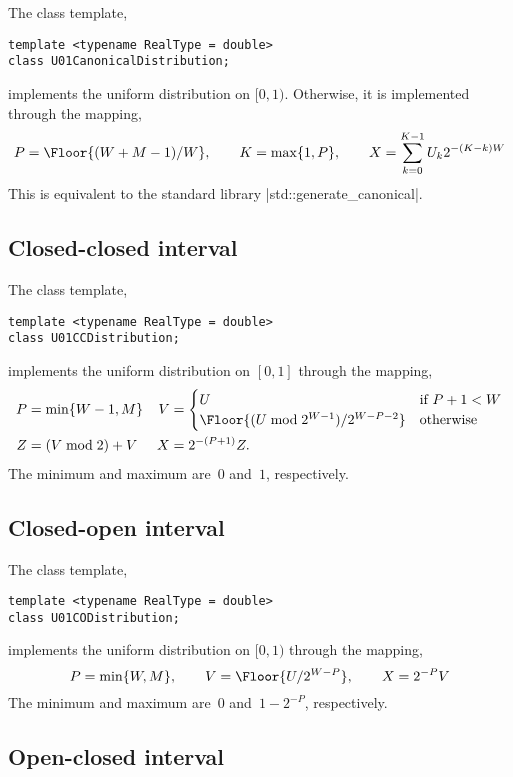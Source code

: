 The class template,
\begin{verbatim}
template <typename RealType = double>
class U01CanonicalDistribution;
\end{verbatim}
implements the uniform distribution on $[0, 1)$. Otherwise, it is implemented
through the mapping,
\begin{equation*}
  P = \Floor{(W + M - 1) / W},\qquad
  K = \max\{1, P\},\qquad
  X = \sum_{k=0}^{K - 1} U_k 2^{-(K - k)W}
\end{equation*}
This is equivalent to the standard library |std::generate_canonical|.

\subsection{Closed-closed interval}
\label{sub:Closed-closed interval}

The class template,
\begin{verbatim}
template <typename RealType = double>
class U01CCDistribution;
\end{verbatim}
implements the uniform distribution on $[0, 1]$ through the mapping,
\begin{align*}
  P &= \min\{W - 1, M\} &
  V &= \begin{cases}
    U &\text{if } P + 1 < W \\
    \Floor{(U \bmod 2^{W - 1}) / 2^{W - P -2}} &\text{otherwise}
  \end{cases} \\
  Z &= (V \bmod 2) + V &
  X &= 2^{-(P + 1)} Z.
\end{align*}
The minimum and maximum are~$0$ and~$1$, respectively.

\subsection{Closed-open interval}
\label{sub:Closed-open interval}

The class template,
\begin{verbatim}
template <typename RealType = double>
class U01CODistribution;
\end{verbatim}
implements the uniform distribution on $[0, 1)$ through the mapping,
\begin{equation*}
  P = \min\{W, M\},\qquad
  V = \Floor{U / 2^{W - P}},\qquad
  X = 2^{-P} V
\end{equation*}
The minimum and maximum are~$0$ and~$1 - 2^{-P}$, respectively.

\subsection{Open-closed interval}
\label{sub:Open-closed interval}

